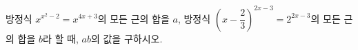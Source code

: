 방정식 $x^{x^2-2}=x^{4x+3}$의 모든 근의 합을 $a$, 방정식 $\left(x-\dfrac{2}{3}\right)^{2x-3}=2^{2x-3}$의 모든 근의 합을 $b$라 할 때, $ab$의 값을 구하시오. 
